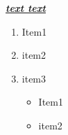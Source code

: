 \documentclass{report}
\begin{document}
    \underline{
        \textit{
            \textbf{
                text text
            }
        }
    }
    
    \begin{enumerate}
        \item Item1
        \item item2
        \item item3 \begin{itemize}
                \item Item1
                \item item2
            \end{itemize}
    \end{enumerate}




\end{document}
